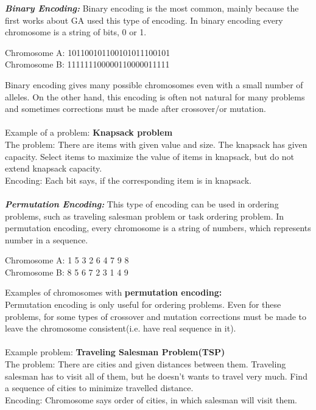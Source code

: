 \documentclass[a4paper, 12pt]{article}
\begin{document}
\textbf{\textit{Binary Encoding: }}
Binary encoding is the most common, mainly because the first works about GA used this type of encoding. In binary encoding every chromosome is
a string of bits, 0 or 1.
\begin{center}
Chromosome A: 101100101100101011100101\\
Chromosome B: 111111100000110000011111
\end{center}
Binary encoding gives many possible chromosomes even with a small number of alleles. On the other hand, this encoding is often not natural for 
many problems and sometimes corrections must be made after crossover/or mutation.\\~\\
Example of a problem:  \textbf{Knapsack problem}\\
The problem:  There are items with given value and size. The knapsack has given capacity. Select items to maximize the value of items in 
knapsack, but do not extend knapsack capacity.\\
Encoding: Each bit says, if the corresponding item is in knapsack.\\~\\
\noindent
\textbf{\textit{Permutation Encoding: }}
This type of encoding can be used in ordering problems, such as traveling salesman problem or task ordering problem. In permutation encoding,
every chromosome is a string of numbers, which represents number in a sequence.
\begin{center}
Chromosome A: 1 5 3 2 6 4 7 9 8\\
Chromosome B: 8 5 6 7 2 3 1 4 9
\end{center}
Examples of chromosomes with \textbf{permutation encoding:}\\
Permutation encoding is only useful for ordering problems. Even for these problems, for some types of crossover and mutation corrections must
be made to leave the chromosome consistent(i.e. have real sequence in it).\\~\\
Example problem: \textbf{Traveling Salesman Problem(TSP)}\\
The problem: There are cities and given distances between them. Traveling salesman has to visit all of them, but he doesn't wants to travel very much. Find a sequence of cities to minimize travelled distance.\\
Encoding: Chromosome says order of cities, in which salesman will visit them.\\~\\
\end{document}
